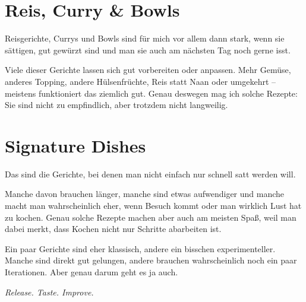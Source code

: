 \documentclass[
a4paper,
11pt
]{article}
\begin{document}

\section{Reis, Curry \& Bowls}

Reisgerichte, Currys und Bowls sind für mich vor allem dann stark, wenn sie sättigen, gut gewürzt sind und man sie auch am nächsten Tag noch gerne isst.

Viele dieser Gerichte lassen sich gut vorbereiten oder anpassen. Mehr Gemüse, anderes Topping, andere Hülsenfrüchte, Reis statt Naan oder umgekehrt -- meistens funktioniert das ziemlich gut. Genau deswegen mag ich solche Rezepte: Sie sind nicht zu empfindlich, aber trotzdem nicht langweilig.

\mylocaltableofcontents%
\newpage








\section{Signature Dishes}

Das sind die Gerichte, bei denen man nicht einfach nur schnell satt werden will.

Manche davon brauchen länger, manche sind etwas aufwendiger und manche macht man wahrscheinlich eher, wenn Besuch kommt oder man wirklich Lust hat zu kochen. Genau solche Rezepte machen aber auch am meisten Spaß, weil man dabei merkt, dass Kochen nicht nur Schritte abarbeiten ist.

Ein paar Gerichte sind eher klassisch, andere ein bisschen experimenteller. Manche sind direkt gut gelungen, andere brauchen wahrscheinlich noch ein paar Iterationen. Aber genau darum geht es ja auch.

\textit{Release. Taste. Improve.}

\mylocaltableofcontents%
\newpage








\end{document}
